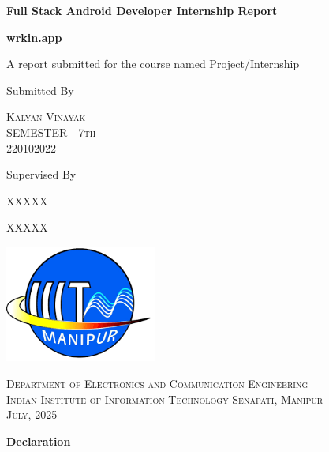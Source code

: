 \documentclass[a4paper, 11pt, oneside]{report}
\begin{document}
\begin{titlepage}
\centering
\vspace*{\baselineskip}
\vspace{0.75\baselineskip}
{\Huge \bfseries Full Stack Android Developer Internship Report}
\vspace{0.5\baselineskip}

{\large \bfseries wrkin.app}
\vspace{2\baselineskip}

A report submitted for the course named Project/Internship
\vspace*{7\baselineskip}

Submitted By

\vspace{0.5\baselineskip}
{\scshape\Large Kalyan Vinayak\\ SEMESTER - 7th \\ 220102022}

\vspace{0.5\baselineskip}
Supervised By

\vspace{0.5\baselineskip}
{\scshape\Large XXXXX}

\vspace{0.5\baselineskip}
{\small XXXXX}

\vfill

 \begin{center}
    \includegraphics[width=5cm]{report_file/iiit manipur.png}
  \end{center}

{\scshape\small Department of Electronics and Communication Engineering\\ Indian Institute of Information Technology Senapati, Manipur \\ July, 2025}
\end{titlepage}


\begin{center}
{\LARGE \textbf{Declaration}}
\end{center}
\end{document}
